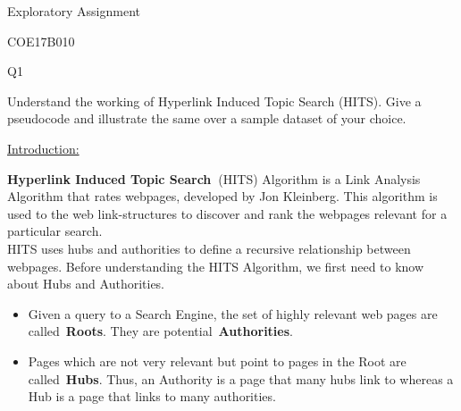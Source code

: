 \documentclass[12pt]{article}
\renewcommand{\_}{\kern-1.5pt\textunderscore\kern-1.5pt}
\begin{document}
\begin{Center}
{\fontsize{28pt}{33.6pt}\selectfont Exploratory Assignment\par}
\end{Center}\par

\begin{Center}
{\fontsize{14pt}{16.8pt}\selectfont COE17B010\par}
\end{Center}\par

\begin{Center}
{\fontsize{28pt}{33.6pt}\selectfont Q1\par}
\end{Center}\par

{\fontsize{14pt}{16.8pt}\selectfont Understand the working of Hyperlink Induced Topic Search (HITS). Give a pseudocode and illustrate the same over a sample dataset of your choice.\par}\par

{\fontsize{14pt}{16.8pt}\selectfont \uline{Introduction:}\par}\par

\setlength{\parskip}{0.0pt}
\textbf{Hyperlink Induced Topic Search }(HITS) Algorithm is a Link Analysis Algorithm that rates webpages, developed by Jon Kleinberg. This algorithm is used to the web link-structures to discover and rank the webpages relevant for a particular search.\\
HITS uses hubs and authorities to define a recursive relationship between webpages. Before understanding the HITS Algorithm, we first need to know about Hubs and Authorities.\par

\begin{itemize}
	\item Given a query to a Search Engine, the set of highly relevant web pages are called \textbf{Roots}. They are potential \textbf{Authorities}.\par

	\item Pages which are not very relevant but point to pages in the Root are called \textbf{Hubs}. Thus, an Authority is a page that many hubs link to whereas a Hub is a page that links to many authorities.
\end{itemize}\par
\end{document}
